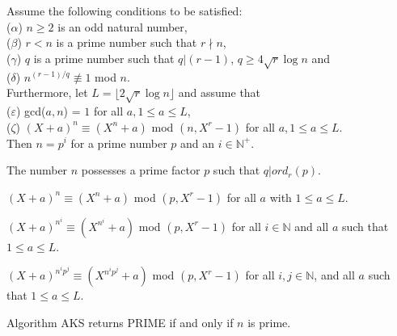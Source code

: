 \documentclass[a4paper]{article}
\begin{document}
\begin{theorem}
Assume the following conditions to be satisfied: \\
($\alpha$) $n \geq 2$ is an odd natural number, \\
($\beta$) $r < n$ is a prime number such that $r \nmid n$, \\
($\gamma$) $q$ is a prime number such that $q|(r - 1)$, $q \geq 4 \sqrt{r}\log{n}$ and \\
($\delta$) $n^{(r - 1) / q} \not \equiv 1$ mod $n$. \\
Furthermore, let $L = \lfloor 2 \sqrt{r} \log{n} \rfloor$ and assume that \\
($\varepsilon$) gcd($a, n$) = $1$ for all $a, 1 \leq a \leq L$, \\
($\zeta$) $(X + a)^{n} \equiv (X^{n} + a)$ mod $(n, X^{r} - 1)$ for all $a, 1 \leq a \leq L$. \\
Then $n = p^{i}$ for a prime number $p$ and an $i \in \mathbb{N}^{+}$.
\end{theorem}


\begin{lemma}
The number $n$ possesses a prime factor $p$ such that $q|ord_{r}(p)$.
\end{lemma}


\begin{lemma}
$(X + a)^{n} \equiv (X^{n} + a)$ mod $(p, X^{r} - 1)$ for all $a$ with $1 \leq a \leq L$.
\end{lemma}


\begin{lemma}
$(X + a)^{n^{i}} \equiv \left( X^{n^{i}} + a \right)$ mod $(p, X^{r} - 1)$ for all $i \in \mathbb{N}$ and all $a$ such that $1 \leq a \leq L$.
\end{lemma}


\begin{lemma}
$(X + a)^{n^{i}p^{j}} \equiv \left( X^{n^{i}p^{j} }+ a \right)$ mod $(p, X^{r} - 1)$ for all $i, j \in \mathbb{N}$, and all $a$ such that $1 \leq a \leq L$.
\end{lemma}


\begin{theorem}
Algorithm AKS returns PRIME if and only if $n$ is prime.
\end{theorem}
\end{document}
